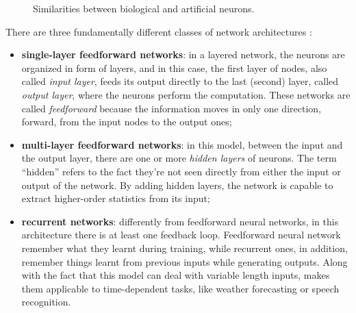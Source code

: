\begin{center}
	\begin{figure}[ht]
		\caption{Similarities between biological \cite{WikipediaNeuron} and artificial neurons.}
	\end{figure}
\end{center}
There are three fundamentally different classes of network architectures \cite{Hay08}:

\begin{itemize}
	\item \textbf{single-layer feedforward networks}: in a layered network, the neurons are organized in form of layers, and in this case, the first layer of nodes, also called \textit{input layer}, feeds its output directly to the last (second) layer, called \textit{output layer}, where the neurons perform the computation. These networks are called \textit{feedforward} because the information moves in only one direction, forward, from the input nodes to the output ones;
	\item \textbf{multi-layer feedforward networks}: in this model, between the input and the output layer, there are one or more \textit{hidden layers} of neurons. The term ``hidden'' refers to the fact they're not seen directly from either the input or output of the network. By adding hidden layers, the network is capable to extract higher-order statistics from its input;
	\item \textbf{recurrent networks}: differently from feedforward neural networks, in this architecture there is at least one feedback loop. Feedforward neural network remember what they learnt during training, while recurrent ones, in addition, remember things learnt from previous inputs while generating outputs. Along with the fact that this model can deal with variable length inputs, makes them applicable to time-dependent tasks, like weather forecasting or speech recognition.
\end{itemize}

